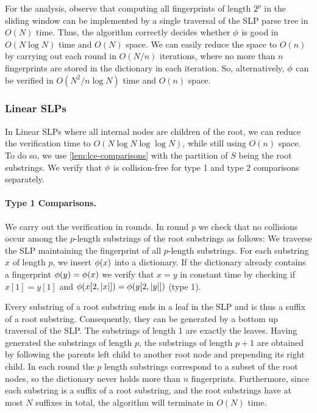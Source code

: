 For the analysis, observe that computing all fingerprints of length $2^p$ in the sliding window can be implemented by a single traversal of the SLP parse tree in $O(N)$ time. Thus, the algorithm correctly decides whether $\phi$ is good in $O(N\log N)$ time and $O(N)$ space. We can easily reduce the space to $O(n)$ by carrying out each round in $O(N/n)$ iterations, where no more than $n$ fingerprints are stored in the dictionary in each iteration. So, alternatively, $\phi$ can be verified in $O(N^2/n \log N)$ time and $O(n)$ space.

\subsubsection{Linear SLPs} In Linear SLPs where all internal nodes are children of the root, we can reduce the verification time to $O(N\log N\log\log N)$, while still using $O(n)$ space. To do so, we use \autoref{lem:lce-comparisons} with the partition of $S$ being the root substrings. We verify that $\phi$ is collision-free for type 1 and type 2 comparisons separately.


\paragraph{Type 1 Comparisons.}
We carry out the verification in rounds. In round $p$ we check that no collisions occur among the $p$-length substrings of the root substrings as follows: We traverse the SLP maintaining the fingerprint of all $p$-length substrings. For each substring $x$ of length $p$, we insert $\phi(x)$ into a dictionary. If the dictionary already contains a fingerprint $\phi(y) = \phi(x)$ we verify that $x=y$ in constant time by checking if $x[1] = y[1]$ and $\phi(x[2,|x|]) = \phi(y[2,|y|])$ (type 1).

Every substring of a root substring ends in a leaf in the SLP and is thus a suffix of a root substring. Consequently, they can be generated by a bottom up traversal of the SLP. The substrings of length 1 are exactly the leaves. Having generated the substrings of length $p$, the substrings of length $p+1$ are obtained by following the parents left child to another root node and prepending its right child. In each round the $p$ length substrings correspond to a subset of the root nodes, so the dictionary never holds more than $n$ fingerprints. Furthermore, since each substring is a suffix of a root substring, and the root substrings have at most $N$ suffixes in total, the algorithm will terminate in $O(N)$ time.


